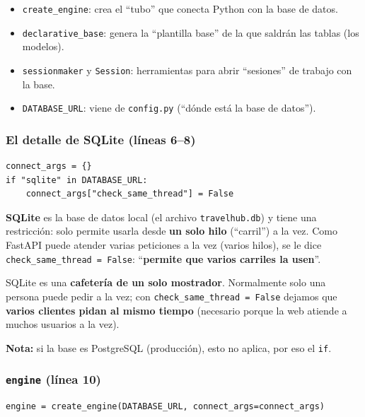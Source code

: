 \documentclass[11pt,a4paper]{article}
\begin{document}
\begin{itemize}
    \item \texttt{create\_engine}: crea el ``tubo'' que conecta Python con la base de datos.
    \item \texttt{declarative\_base}: genera la ``plantilla base'' de la que saldrán las tablas (los modelos).
    \item \texttt{sessionmaker} y \texttt{Session}: herramientas para abrir ``sesiones'' de trabajo con la base.
    \item \texttt{DATABASE\_URL}: viene de \texttt{config.py} (``dónde está la base de datos'').
\end{itemize}

\subsubsection{El detalle de SQLite (líneas 6--8)}

\begin{lstlisting}
connect_args = {}
if "sqlite" in DATABASE_URL:
    connect_args["check_same_thread"] = False
\end{lstlisting}

\textbf{SQLite} es la base de datos local (el archivo \texttt{travelhub.db}) y tiene una
restricción: solo permite usarla desde \textbf{un solo hilo} (``carril'') a la vez. Como
FastAPI puede atender varias peticiones a la vez (varios hilos), se le dice
\texttt{check\_same\_thread = False}: ``\textbf{permite que varios carriles la usen}''.

\begin{analogia}
SQLite es una \textbf{cafetería de un solo mostrador}. Normalmente solo una persona puede pedir
a la vez; con \texttt{check\_same\_thread = False} dejamos que \textbf{varios clientes pidan al mismo tiempo}
(necesario porque la web atiende a muchos usuarios a la vez).
\end{analogia}

\textbf{Nota:} si la base es PostgreSQL (producción), esto no aplica, por eso el \texttt{if}.

\subsubsection{\texttt{engine} (línea 10)}

\begin{lstlisting}
engine = create_engine(DATABASE_URL, connect_args=connect_args)
\end{lstlisting}
\end{document}
